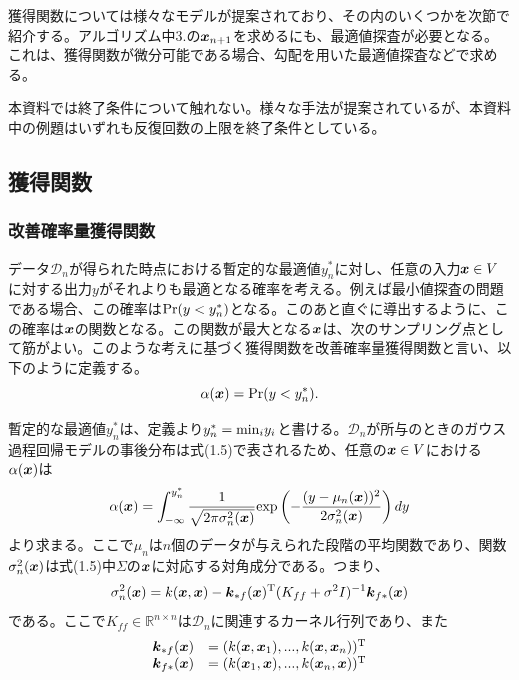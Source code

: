 \documentclass[dvipdfmx, 9pt, a4paper]{jsarticle}
\numberwithin{equation}{section}
\newcommand{\bm}[1]{{\mbox{\boldmath $#1$}}}
\begin{document}
獲得関数については様々なモデルが提案されており、その内のいくつかを次節で紹介する。アルゴリズム中3.の$\bm x_{n+1}$を求めるにも、最適値探査が必要となる。これは、獲得関数が微分可能である場合、勾配を用いた最適値探査などで求める。\par
本資料では終了条件について触れない。様々な手法が提案されているが、本資料中の例題はいずれも反復回数の上限を終了条件としている。

\subsection{獲得関数}
\subsubsection{改善確率量獲得関数}
データ$\mathcal{D}_n$が得られた時点における暫定的な最適値$y^*_n$に対し、任意の入力$\bm x \in V$に対する出力$y$がそれよりも最適となる確率を考える。例えば最小値探査の問題である場合、この確率は${\rm Pr}(y < y^*_n)$となる。このあと直ぐに導出するように、この確率は$\bm x$の関数となる。この関数が最大となる$\bm x$は、次のサンプリング点として筋がよい。このような考えに基づく獲得関数を改善確率量獲得関数と言い、以下のように定義する。
\begin{equation}
\alpha(\bm x)={\rm Pr}(y < y^*_n).
\end{equation}\par
暫定的な最適値$y^*_n$は、定義より$y^*_n={\rm min}_i y_i$と書ける。$\mathcal{D}_n$が所与のときのガウス過程回帰モデルの事後分布は式(1.5)で表されるため、任意の$\bm x \in V$における$\alpha(\bm x)$は
\begin{equation}
\alpha(\bm x)=\int_{-\infty}^{y^*_n}\frac{1}{\sqrt{2\pi \sigma^2_n(\bm x)}}{\rm exp}\left(-\frac{(y-\mu_n(\bm x))^2}{2\sigma^2_n(\bm x)}\right)dy \notag
\end{equation}
より求まる。ここで$\mu_n$は$n$個のデータが与えられた段階の平均関数であり、関数$\sigma^2_n(\bm x)$は式(1.5)中$\Sigma$の$\bm x$に対応する対角成分である。つまり、
\begin{equation}
\sigma^2_n(\bm x) = k(\bm x, \bm x) - \bm k_{*f}(\bm x)^{\rm T}(K_{ff}+\sigma^2I)^{-1}\bm k_{f*}(\bm x) \notag
\end{equation}
である。ここで$K_{ff} \in \mathbb{R}^{n \times n}$は$\mathcal{D}_n$に関連するカーネル行列であり、また
\begin{equation}
\begin{array}{ll}
\bm k_{*f}(\bm x) & = (k(\bm x, \bm x_1), ..., k(\bm x, \bm x_n))^{\rm T} \\
\bm k_{f*}(\bm x) & = (k(\bm x_1, \bm x), ..., k(\bm x_n, \bm x))^{\rm T} \\
\end{array}
\end{equation}
\end{document}
